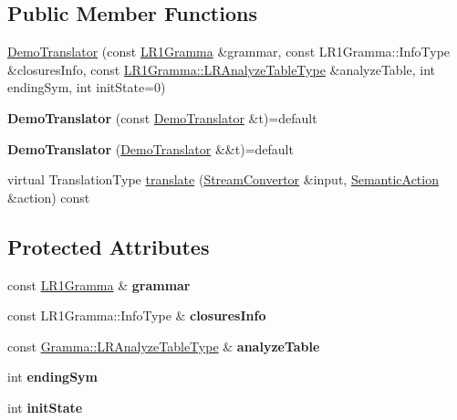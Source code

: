 \subsection*{Public Member Functions}
\begin{DoxyCompactItemize}
\item 
\hyperlink{classx2_1_1_demo_translator_a5c8a3792ff989f0779f49b4b4824a66d}{Demo\+Translator} (const \hyperlink{classx2_1_1_l_r1_gramma}{L\+R1\+Gramma} \&grammar, const L\+R1\+Gramma\+::\+Info\+Type \&closures\+Info, const \hyperlink{classx2_1_1_gramma_a33681053b045219ea58cc68c3faa4975}{L\+R1\+Gramma\+::\+L\+R\+Analyze\+Table\+Type} \&analyze\+Table, int ending\+Sym, int init\+State=0)
\item 
\mbox{\label{classx2_1_1_demo_translator_aa0501ad4afe91afffea6491343c0616c}} 
{\bfseries Demo\+Translator} (const \hyperlink{classx2_1_1_demo_translator}{Demo\+Translator} \&t)=default
\item 
\mbox{\label{classx2_1_1_demo_translator_a4372d69215029ca5c8fe28489598cfd6}} 
{\bfseries Demo\+Translator} (\hyperlink{classx2_1_1_demo_translator}{Demo\+Translator} \&\&t)=default
\item 
virtual Translation\+Type \hyperlink{classx2_1_1_demo_translator_a5013adbe85fb2bb68d33433454787a02}{translate} (\hyperlink{classx2_1_1_stream_convertor}{Stream\+Convertor} \&input, \hyperlink{classx2_1_1_semantic_action}{Semantic\+Action} \&action) const
\end{DoxyCompactItemize}
\subsection*{Protected Attributes}
\begin{DoxyCompactItemize}
\item 
\mbox{\label{classx2_1_1_demo_translator_adbc8cab8e875be2b3bddeb18bfb8eebd}} 
const \hyperlink{classx2_1_1_l_r1_gramma}{L\+R1\+Gramma} \& {\bfseries grammar}
\item 
\mbox{\label{classx2_1_1_demo_translator_a6be6d8958fe9fc1caf0264c9a6a2077f}} 
const L\+R1\+Gramma\+::\+Info\+Type \& {\bfseries closures\+Info}
\item 
\mbox{\label{classx2_1_1_demo_translator_ae1a8138d37f33b2b5662c2327a83c041}} 
const \hyperlink{classx2_1_1_gramma_a33681053b045219ea58cc68c3faa4975}{Gramma\+::\+L\+R\+Analyze\+Table\+Type} \& {\bfseries analyze\+Table}
\item 
\mbox{\label{classx2_1_1_demo_translator_aff2ec433bc4326e419fcbc3c1971badb}} 
int {\bfseries ending\+Sym}
\item 
\mbox{\label{classx2_1_1_demo_translator_a8c1f23b69aab28178a293ded8262a13a}} 
int {\bfseries init\+State}
\end{DoxyCompactItemize}


